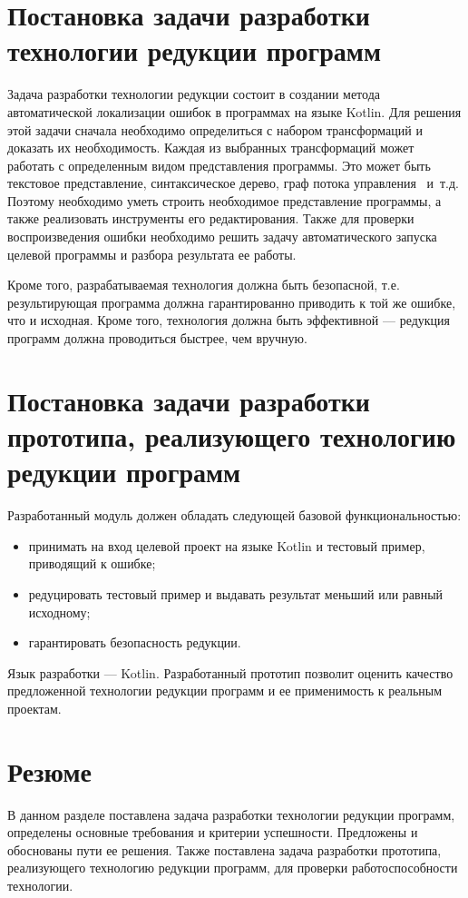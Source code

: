 \section{Постановка задачи разработки технологии редукции программ}
Задача разработки технологии редукции состоит в создании метода автоматической локализации ошибок в программах на языке Kotlin. Для решения этой задачи сначала необходимо определиться с набором трансформаций и доказать их необходимость. Каждая из выбранных трансформаций может работать с определенным видом представления программы. Это может быть текстовое представление, синтаксическое дерево, граф потока управления~\cite{harrold2005representation} и~т.д. Поэтому необходимо уметь строить необходимое представление программы, а также реализовать инструменты его редактирования. Также для проверки воспроизведения ошибки необходимо решить задачу автоматического запуска целевой программы и разбора результата ее работы.

Кроме того, разрабатываемая технология должна быть безопасной, т.е. результирующая программа должна гарантированно приводить к той же ошибке, что и исходная. Кроме того, технология должна быть эффективной --- редукция программ должна проводиться быстрее, чем вручную.

\section{Постановка задачи разработки прототипа, реализующего технологию редукции программ}
Разработанный модуль должен обладать следующей базовой функциональностью:
\begin{itemize}
\item принимать на вход целевой проект на языке Kotlin и тестовый пример, приводящий к ошибке;
\item редуцировать тестовый пример и выдавать результат меньший или равный исходному;
\item гарантировать безопасность редукции.
\end{itemize}
Язык разработки --- Kotlin. Разработанный прототип позволит оценить качество предложенной технологии редукции программ и ее применимость к реальным проектам.

\section{Резюме}
В данном разделе поставлена задача разработки технологии редукции программ, определены основные требования и критерии успешности. Предложены и обоснованы пути ее решения. Также поставлена задача разработки прототипа, реализующего технологию редукции программ, для проверки работоспособности технологии.
